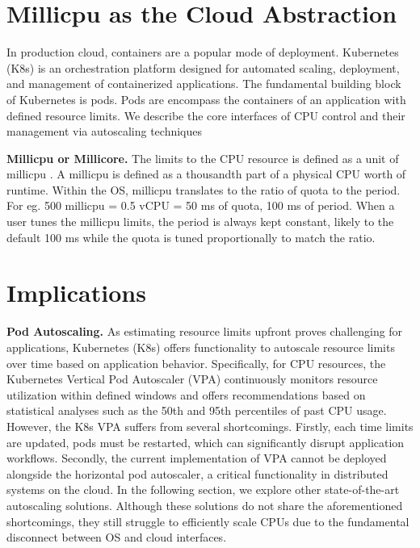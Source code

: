 \section{Millicpu as the Cloud Abstraction}

In production cloud, containers are a popular mode of deployment. Kubernetes (K8s) \cite{noauthor_production-grade_nodate} is an orchestration platform designed for automated scaling, deployment, and management of containerized applications. The fundamental building block of Kubernetes is pods. Pods are encompass the containers of an application with defined resource limits. We describe the core interfaces of CPU control and their management via autoscaling techniques

\textbf{Millicpu or Millicore.} The limits to the CPU resource is defined as a unit of millicpu \cite{noauthor_resource_nodate}. A millicpu is defined as a thousandth part of a physical CPU worth of runtime. Within the OS, millicpu translates to the ratio of quota to the period. For eg. 500 millicpu = 0.5 vCPU = 50 ms of quota, 100 ms of period. When a user tunes the millicpu limits, the period is always kept constant, likely to the default 100 ms while the quota is tuned proportionally to match the ratio.

\section{Implications}


\textbf{Pod Autoscaling.} As estimating resource limits upfront proves challenging for applications, Kubernetes (K8s) offers functionality to autoscale resource limits over time based on application behavior. Specifically, for CPU resources, the Kubernetes Vertical Pod Autoscaler (VPA) \cite{noauthor_kubernetes_nodate} continuously monitors resource utilization within defined windows and offers recommendations based on statistical analyses such as the 50th and 95th percentiles of past CPU usage. However, the K8s VPA suffers from several shortcomings. Firstly, each time limits are updated, pods must be restarted, which can significantly disrupt application workflows. Secondly, the current implementation of VPA cannot be deployed alongside the horizontal pod autoscaler, a critical functionality in distributed systems on the cloud. In the following section, we explore other state-of-the-art autoscaling solutions. Although these solutions do not share the aforementioned shortcomings, they still struggle to efficiently scale CPUs due to the fundamental disconnect between OS and cloud interfaces.